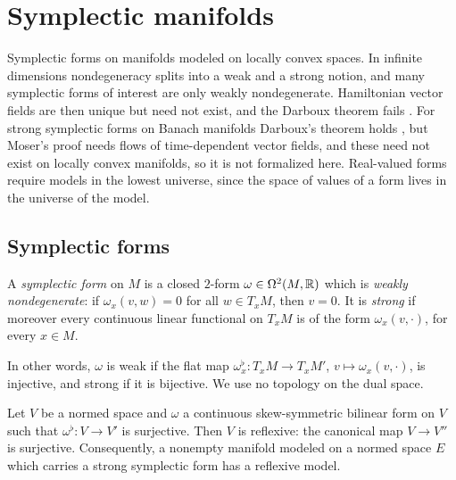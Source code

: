 \chapter{Symplectic manifolds}
\label{chap:symplectic}

Symplectic forms on manifolds modeled on locally convex spaces. In infinite dimensions
nondegeneracy splits into a weak and a strong notion, and many symplectic forms of interest are
only weakly nondegenerate. Hamiltonian vector fields are then unique but need not exist, and the
Darboux theorem fails \cite[Proposition, p.~591]{Mar72}. For strong symplectic forms on Banach
manifolds Darboux's theorem holds \cite[\S1, Theorem]{Wei69}, but Moser's proof needs flows of time-dependent vector fields, and
these need not exist on locally convex manifolds, so it is not formalized here. Real-valued forms
require models in the lowest universe, since the space of values of a form lives in the universe
of the model.

\section{Symplectic forms}

\begin{definition}
  \label{def:symplectic}
  \leanok
  A \emph{symplectic form} on $M$ is a closed $2$-form $\omega \in \Omega^2(M, \mathbb{R})$ which is
  \emph{weakly nondegenerate}: if $\omega_x(v, w) = 0$ for all $w \in T_xM$, then $v = 0$. It is
  \emph{strong} if moreover every continuous linear functional on $T_xM$ is of the form
  $\omega_x(v, \cdot)$, for every $x \in M$.
\end{definition}

In other words, $\omega$ is weak if the flat map $\omega^\flat_x \colon T_xM \to T_xM'$,
$v \mapsto \omega_x(v, \cdot)$, is injective, and strong if it is bijective. We use no topology
on the dual space.

\begin{theorem}
  \label{thm:symplectic-reflexive}
  \leanok
  Let $V$ be a normed space and $\omega$ a continuous skew-symmetric bilinear form on $V$ such
  that $\omega^\flat \colon V \to V'$ is surjective. Then $V$ is reflexive: the canonical map
  $V \to V''$ is surjective. Consequently, a nonempty manifold modeled on a normed space $E$ which
  carries a strong symplectic form has a reflexive model.
\end{theorem}

